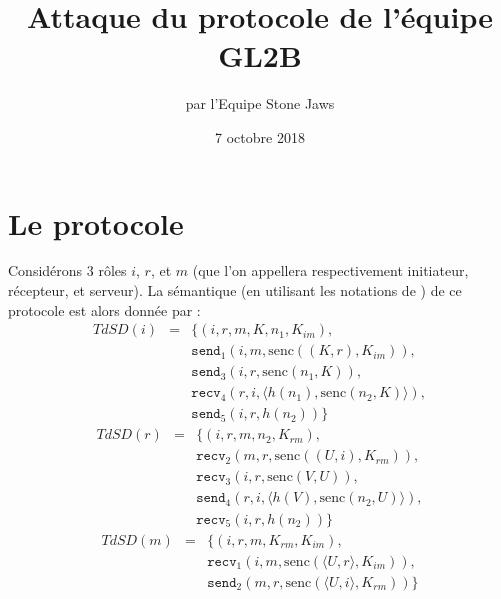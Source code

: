 \documentclass[a4paper,10pt]{article}
\title{Attaque du protocole de l'équipe GL2B}
\author{par l'Equipe Stone Jaws}
\date{7 octobre 2018}
\begin{document}
\maketitle

\section{Le protocole}

Considérons 3 rôles $i$, $r$, et $m$ (que l'on appellera respectivement initiateur, récepteur, et serveur). La sémantique (en utilisant les notations de \cite{cas}) de ce protocole est alors donnée par :
\begin{eqnarray*}
	TdSD(i) & = & \{ (i,r,m, K, n_1, K_{im}), \\
		& & \texttt{send}_1(i,m, \textrm{senc}((K,r),K_{im}) ),\\
		& & \texttt{send}_3(i,r, \textrm{senc}(n_1,K) ),\\
		& & \texttt{recv}_4(r,i, \langle h(n_1), \textrm{senc}(n_2,K) \rangle),\\
		& & \texttt{send}_5(i,r, h(n_2))\}
\end{eqnarray*}
\begin{eqnarray*}
	TdSD(r) & = & \{ (i,r,m, n_2, K_{rm}), \\
		& & \texttt{recv}_2(m,r, \textrm{senc}((U,i),K_{rm}) ),\\
		& & \texttt{recv}_3(i,r, \textrm{senc}(V,U)),\\
		& & \texttt{send}_4(r,i, \langle h(V), \textrm{senc}(n_2,U) \rangle),\\
		& & \texttt{recv}_5(i,r, h(n_2))\}
\end{eqnarray*}
\begin{eqnarray*}
	TdSD(m) & = & \{ (i,r,m, K_{rm}, K_{im}), \\
		& & \texttt{recv}_1(i,m, \textrm{senc}(\langle U,r \rangle,K_{im}) ),\\
		& & \texttt{send}_2(m,r, \textrm{senc}(\langle U,i \rangle,K_{rm}) )\}
\end{eqnarray*}
\end{document}

